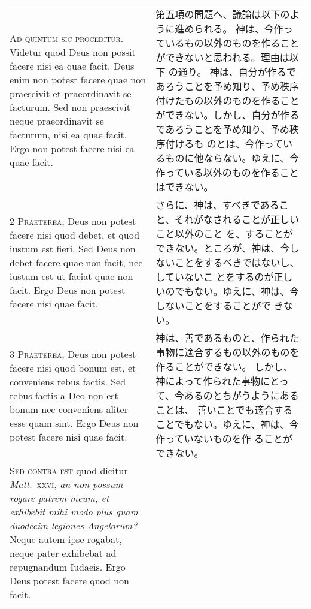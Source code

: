 \documentclass[10pt]{jsarticle} %
\begin{document}
\begin{longtable}{p{21em}p{21em}}


{\Huge A}{\scshape d quintum sic proceditur}. Videtur quod
Deus non possit facere nisi ea quae facit. Deus enim non potest facere
quae non praescivit et praeordinavit se facturum. Sed non praescivit
neque praeordinavit se facturum, nisi ea quae facit. Ergo non potest
facere nisi ea quae facit.

&

第五項の問題へ、議論は以下のように進められる。
神は、今作っているもの以外のものを作ることができないと思われる。理由は以下
の通り。
神は、自分が作るであろうことを予め知り、予め秩序付けたもの以外のものを作ること
ができない。しかし、自分が作るであろうことを予め知り、予め秩序付けるも
のとは、今作っているものに他ならない。ゆえに、今作っている以外のものを作ること
はできない。



\\


{\scshape 2 Praeterea}, Deus non potest facere nisi quod
debet, et quod iustum est fieri. Sed Deus non debet facere quae non
facit, nec iustum est ut faciat quae non facit. Ergo Deus non potest
facere nisi quae facit.


&

さらに、神は、すべきであること、それがなされることが正しいこと以外のこと
 を、することができない。ところが、神は、今しないことをするべきではないし、していないこ
とをするのが正しいのでもない。ゆえに、神は、今しないことをすることがで
きない。

\\


{\scshape 3 Praeterea}, Deus non potest facere nisi quod
bonum est, et conveniens rebus factis. Sed rebus factis a Deo non est
bonum nec conveniens aliter esse quam sint. Ergo Deus non potest facere
nisi quae facit.


&

神は、善であるものと、作られた事物に適合するもの以外のものを作ることができない。
しかし、神によって作られた事物にとって、今あるのとちがうようにあることは、
 善いことでも適合することでもない。ゆえに、神は、今作っていないものを作
 ることができない。

\\


{\scshape Sed contra est} quod dicitur {\itshape Matt}.~{\scshape xxvi}, {\itshape an
non possum rogare patrem meum, et exhibebit mihi modo plus quam duodecim
legiones Angelorum?} Neque autem ipse rogabat, neque pater exhibebat ad
repugnandum Iudaeis. Ergo Deus potest facere quod non facit.



\end{longtable}
\end{document}
